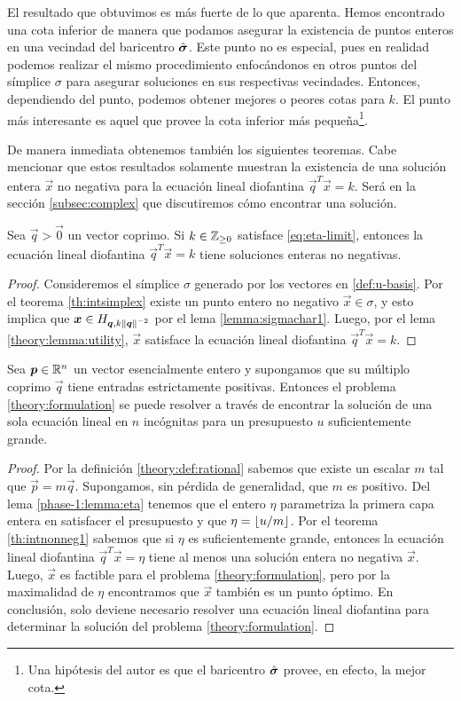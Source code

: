 El resultado que obtuvimos es más fuerte de lo que aparenta. Hemos encontrado una
cota inferior de manera que podamos asegurar la existencia de puntos enteros en una vecindad del
baricentro $\hat{\boldsymbol{ \sigma }}$. Este punto no es especial, pues en realidad podemos realizar el mismo
procedimiento enfocándonos en otros puntos del símplice $\sigma$ para asegurar soluciones en sus
respectivas vecindades. Entonces, dependiendo del punto, podemos obtener mejores o peores cotas para
$k$. El punto más interesante es aquel que provee la cota inferior más pequeña\footnote{
	Una hipótesis del autor es que el baricentro $\hat{\boldsymbol{ \sigma }}$ provee, en efecto, la mejor cota.
}.

De manera inmediata obtenemos también los siguientes teoremas. Cabe mencionar que estos resultados
solamente muestran la existencia de una solución entera $\vec{x}$ no negativa para la ecuación lineal
diofantina $\vec{q}^T\vec{x} = k$. Será en la sección \ref{subsec:complex} que discutiremos cómo
encontrar una solución.
\begin{theorem}
	\label{th:intnonneg1}
	Sea $\vec{q} > \vec{0}$ un vector coprimo. Si $k \in \mathbb{Z}_{\geq 0}$ satisface \eqref{eq:eta-limit},
	entonces la ecuación lineal diofantina $\vec{q}^T\vec{x} = k$ tiene soluciones enteras no
	negativas.
\end{theorem}
\begin{proof}
	Consideremos el símplice $\sigma$ generado por los vectores en \eqref{def:u-basis}.
	Por el teorema \ref{th:intsimplex} existe un punto entero no negativo $\vec{x} \in \sigma$, y
	esto implica que $\boldsymbol{x} \in H_{\boldsymbol{q}, k\left\lVert \boldsymbol{q} \right\rVert^{-2}}$ por el lema \ref{lemma:sigmachar1}.
	Luego, por el lema \ref{theory:lemma:utility}, $\vec{x}$ satisface la ecuación lineal diofantina
	$\vec{q}^T\vec{x} = k$.
\end{proof}
\begin{theorem}
	\label{th:intnonneg2}
	Sea $\boldsymbol{p} \in \mathbb{R}^n$ un vector esencialmente entero y supongamos que su múltiplo coprimo
	$\vec{q}$ tiene entradas estrictamente positivas. Entonces el problema
	\eqref{theory:formulation} se puede resolver a través de encontrar la solución de una sola
	ecuación lineal en $n$ incógnitas para un presupuesto $u$ suficientemente grande.
\end{theorem}
\begin{proof}
	Por la definición \ref{theory:def:rational} sabemos que existe un escalar $m$ tal que
	$\vec{p} = m\vec{q}$. Supongamos, sin pérdida de generalidad, que $m$ es positivo. Del lema
	\ref{phase-1:lemma:eta} tenemos que el entero $\eta$ parametriza la primera capa entera en
	satisfacer el presupuesto y que $\eta = \left\lfloor u/m \right\rfloor$. Por el teorema \ref{th:intnonneg1} sabemos
	que si $\eta$ es suficientemente grande, entonces la ecuación lineal diofantina
	$\vec{q}^T\vec{x} = \eta$ tiene al menos una solución entera no negativa $\vec{x}$. Luego,
	$\vec{x}$ es factible para el problema \eqref{theory:formulation}, pero por la maximalidad de
	$\eta$ encontramos que $\vec{x}$ también es un punto óptimo. En conclusión, solo deviene
	necesario resolver una ecuación lineal diofantina para determinar la solución del problema
	\eqref{theory:formulation}.
\end{proof}

